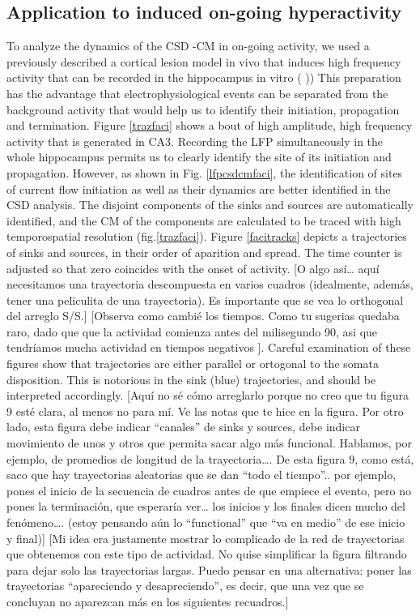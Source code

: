\documentclass[letterpaper,12pts]{article}
\newcommand{\komment}[1]{{\color{red} [#1]}}
\newcommand{\romment}[1]{{\color{blue} [#1]}}
\begin{document}
\subsection{Application to induced on-going hyperactivity }

To analyze the dynamics of the CSD -CM in on-going activity, we used a previously described a cortical lesion model in vivo that induces high frequency activity that can be recorded in the hippocampus in vitro (\cite{Franco2015, Franco2018} )) This preparation has the advantage that electrophysiological events can be separated from the background activity that would help us to identify their initiation, propagation and 
termination. Figure \ref{trazfaci} shows a bout of high amplitude, high frequency activity that is generated in CA3. Recording the LFP simultaneously in the whole hippocampus permits us to clearly identify the site of its initiation and propagation. However, as shown in Fig. \ref{lfpcsdcmfaci}, the identification of sites of current flow initiation as well as their dynamics are better identified in the CSD analysis. The disjoint components of the sinks and sources are automatically identified, and the CM of the components are calculated to be traced with high temporospatial resolution (fig.\ref{trazfaci}). 
  Figure \ref{facitracks} depicts a trajectories of sinks and sources, in their order
  of aparition and spread. The time counter is adjusted so that zero coincides
  with the onset of activity. 
  \romment{O algo así… aquí necesitamos una trayectoria descompuesta en varios cuadros (idealmente, además, tener una peliculita de una trayectoria). Es importante que se vea lo orthogonal del arreglo S/S.}
  \komment{Observa como cambié los tiempos. Como tu sugerias quedaba raro, dado que
    que la actividad comienza antes del milisegundo 90, asi que tendríamos
    mucha actividad en tiempos negativos }.
  Careful examination of these figures show that trajectories are either parallel or ortogonal to the somata disposition. This is notorious in the sink (blue) trajectories, and should be interpreted accordingly.
  \romment{Aquí no sé cómo arreglarlo porque no creo que tu figura 9 esté clara, al menos no para mí. Ve las notas que te hice en la figura. Por otro lado, esta figura debe indicar “canales” de sinks y sources, debe indicar movimiento de unos y otros que permita sacar algo más funcional. Hablamos, por ejemplo, de promedios de longitud de la trayectoria…. De esta figura 9, como está, saco que hay trayectorias aleatorias que se dan “todo el tiempo”.. por ejemplo, pones el inicio de la secuencia de cuadros antes de que empiece el evento, pero no pones la terminación, que esperaría ver… los inicios y los finales dicen mucho del fenómeno…. (estoy pensando aún lo “functional” que “va en medio” de ese inicio y final)}
  \komment{Mi idea era justamente mostrar lo complicado de la red de trayectorias que
    obtenemos con este tipo de actividad. No quise simplificar la figura filtrando para dejar solo las trayectorias largas. Puedo pensar en una alternativa: poner las trayectorias ``apareciendo y desapreciendo'', es decir, que una vez que se concluyan no aparezcan
    más en los siguientes recuadros.}
\end{document}
